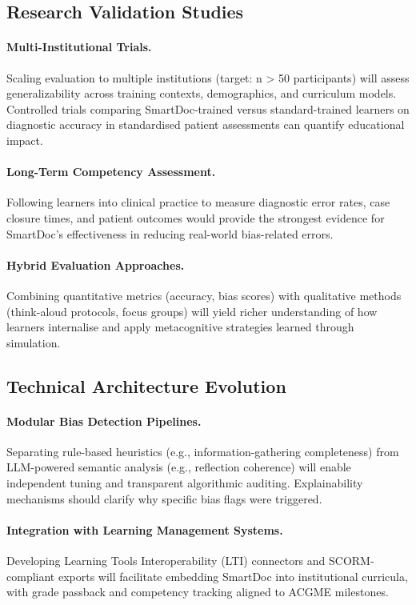 \subsection{Research Validation Studies}

\paragraph{Multi-Institutional Trials.}
Scaling evaluation to multiple institutions (target: n > 50 participants) will assess
generalizability across training contexts, demographics, and curriculum models. Controlled
trials comparing SmartDoc-trained versus standard-trained learners on diagnostic accuracy
in standardised patient assessments can quantify educational impact.

\paragraph{Long-Term Competency Assessment.}
Following learners into clinical practice to measure diagnostic error rates, case closure
times, and patient outcomes would provide the strongest evidence for SmartDoc's
effectiveness in reducing real-world bias-related errors.

\paragraph{Hybrid Evaluation Approaches.}
Combining quantitative metrics (accuracy, bias scores) with qualitative methods (think-aloud
protocols, focus groups) will yield richer understanding of how learners internalise and
apply metacognitive strategies learned through simulation.

\subsection{Technical Architecture Evolution}

\paragraph{Modular Bias Detection Pipelines.}
Separating rule-based heuristics (e.g., information-gathering completeness) from
LLM-powered semantic analysis (e.g., reflection coherence) will enable independent tuning
and transparent algorithmic auditing. Explainability mechanisms should clarify why specific
bias flags were triggered.

\paragraph{Integration with Learning Management Systems.}
Developing Learning Tools Interoperability (LTI) connectors and SCORM-compliant exports
will facilitate embedding SmartDoc into institutional curricula, with grade passback and
competency tracking aligned to ACGME milestones.

